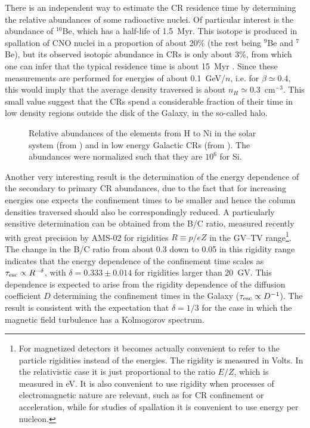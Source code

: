 \documentclass[twoside,12pt]{article}
\begin{document}
There is an independent way to estimate the CR residence time by determining the relative abundances of some radioactive nuclei. Of particular interest is the abundance of $^{10}$Be, which has a half-life of 1.5~Myr. This isotope is produced in spallation of CNO nuclei in a proportion of about 20\% (the rest being $^9$Be and $^7$Be), but its observed isotopic abundance in CRs is only about 3\%, from which one can infer that the typical residence time is about 15~Myr  \cite{be10}. Since these measurements are performed for energies of about 0.1~GeV/$n$, i.e. for $\beta\simeq 0.4$, this would imply that the average density traversed is about $n_H\simeq 0.3$~cm$^{-3}$. This small value suggest that the CRs spend a considerable fraction of their time in low density regions  outside the disk of the Galaxy, in the so-called halo. 

\begin{figure}[tb]
\begin{center}
\begin{minipage}[t]{8 cm}
\centerline{}
\end{minipage}
\caption{Relative abundances of the elements from H to Ni in the solar system (from \cite{lo03}) and in low energy Galactic CRs (from  \cite{criscomp,smart}).  The abundances were normalized such that they are $10^6$ for Si.\label{compsolgcr}}
\end{center}
\end{figure}

Another very interesting result is the determination of the energy dependence of the secondary to primary CR abundances, due to the fact that for increasing energies one expects the confinement times to be smaller and hence the column densities traversed should also be correspondingly reduced. A particularly sensitive determination can be obtained from the B/C ratio, measured recently with great precision by AMS-02 \cite{amsb2c} for rigidities $R\equiv p/eZ$ in the GV--TV range\footnote{ For magnetized detectors it becomes actually convenient to refer to the particle rigidities instead of the energies. The rigidity is measured in Volts. In the relativistic case it is just proportional to the ratio $E/Z$, which is measured in eV. It is also convenient to use rigidity when processes of electromagnetic nature are relevant, such as for CR confinement or acceleration, while for studies of spallation it is convenient to use  energy per nucleon.}.  
The change in the B/C ratio from about 0.3 down to 0.05 in this rigidity range indicates that the energy dependence of the confinement time scales as $\tau_{\rm esc}\propto R^{-\delta}$, with $\delta=0.333\pm 0.014$ for rigidities larger than 20~GV. This  dependence is expected to arise from the rigidity dependence of the diffusion coefficient $D$ determining the confinement times in the Galaxy ($\tau_{\rm esc}\propto D^{-1}$). The result is consistent with the expectation that $\delta=1/3$ for the case in which the magnetic field turbulence has a Kolmogorov spectrum.
\end{document}

